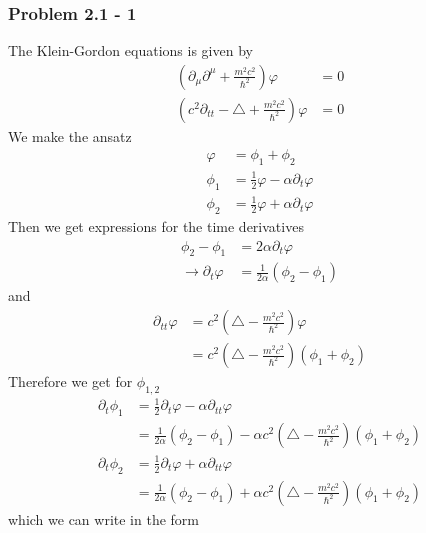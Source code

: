 \documentclass[10pt,a4paper]{article}
\theoremstyle{definition}
\begin{document}
\subsubsection{Problem 2.1 - 1}
The Klein-Gordon equations is given by
\begin{align}
    \left(\partial_\mu\partial^\mu+\frac{m^2c^2}{\hbar^2}\right)\varphi&=0\\
    \left(c^2\partial_{tt}-\triangle+\frac{m^2c^2}{\hbar^2}\right)\varphi&=0
\end{align}
We make the ansatz
\begin{align}
    \varphi&=\phi_1+\phi_2\\
    \phi_1&=\frac{1}{2}\varphi-\alpha\partial_t\varphi\\
    \phi_2&=\frac{1}{2}\varphi+\alpha\partial_t\varphi
\end{align}
Then we get expressions for the time derivatives 
\begin{align}
    \phi_2-\phi_1&=2\alpha\partial_t\varphi\\
    \rightarrow\partial_t\varphi&=\frac{1}{2\alpha}(\phi_2-\phi_1)
\end{align}
and
\begin{align}
    \partial_{tt}\varphi&=c^2\left(\triangle-\frac{m^2c^2}{\hbar^2}\right)\varphi\\
    &=c^2\left(\triangle-\frac{m^2c^2}{\hbar^2}\right)(\phi_1+\phi_2)
\end{align}
Therefore we get for $\phi_{1,2}$
\begin{align}
    \partial_t\phi_1
    &=\frac{1}{2}\partial_t\varphi-\alpha\partial_{tt}\varphi\\
    &=\frac{1}{2\alpha}(\phi_2-\phi_1)-\alpha c^2\left(\triangle-\frac{m^2c^2}{\hbar^2}\right)(\phi_1+\phi_2)\\
    \partial_t\phi_2
    &=\frac{1}{2}\partial_t\varphi+\alpha\partial_{tt}\varphi\\
    &=\frac{1}{2\alpha}(\phi_2-\phi_1)+\alpha c^2\left(\triangle-\frac{m^2c^2}{\hbar^2}\right)(\phi_1+\phi_2)
\end{align}
which we can write in the form
\end{document}

